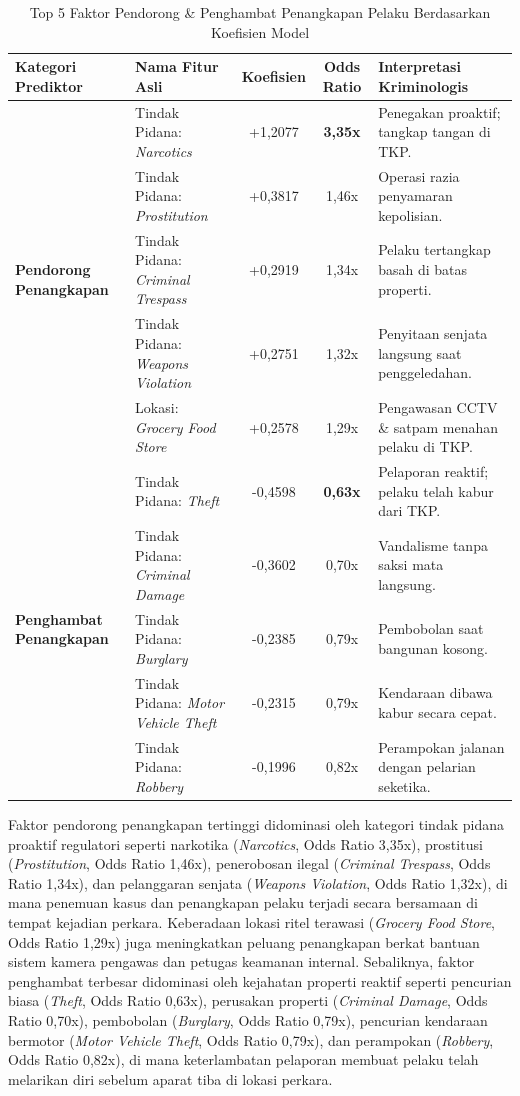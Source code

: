 \documentclass[11pt,a4paper]{article}
\begin{document}
\begin{table}[h]
\centering
\small
\caption{Top 5 Faktor Pendorong \& Penghambat Penangkapan Pelaku Berdasarkan Koefisien Model}
\label{tab:coefficients}
\begin{tabularx}{\textwidth}{lXccX}
\toprule
\textbf{Kategori Prediktor} & \textbf{Nama Fitur Asli} & \textbf{Koefisien} & \textbf{Odds Ratio} & \textbf{Interpretasi Kriminologis} \\
\midrule
\multirow{5}{*}{\textbf{Pendorong Penangkapan}} 
 & Tindak Pidana: \textit{Narcotics} & +1,2077 & \textbf{3,35x} & Penegakan proaktif; tangkap tangan di TKP. \\
 & Tindak Pidana: \textit{Prostitution} & +0,3817 & 1,46x & Operasi razia penyamaran kepolisian. \\
 & Tindak Pidana: \textit{Criminal Trespass} & +0,2919 & 1,34x & Pelaku tertangkap basah di batas properti. \\
 & Tindak Pidana: \textit{Weapons Violation} & +0,2751 & 1,32x & Penyitaan senjata langsung saat penggeledahan. \\
 & Lokasi: \textit{Grocery Food Store} & +0,2578 & 1,29x & Pengawasan CCTV \& satpam menahan pelaku di TKP. \\
\midrule
\multirow{5}{*}{\textbf{Penghambat Penangkapan}} 
 & Tindak Pidana: \textit{Theft} & -0,4598 & \textbf{0,63x} & Pelaporan reaktif; pelaku telah kabur dari TKP. \\
 & Tindak Pidana: \textit{Criminal Damage} & -0,3602 & 0,70x & Vandalisme tanpa saksi mata langsung. \\
 & Tindak Pidana: \textit{Burglary} & -0,2385 & 0,79x & Pembobolan saat bangunan kosong. \\
 & Tindak Pidana: \textit{Motor Vehicle Theft} & -0,2315 & 0,79x & Kendaraan dibawa kabur secara cepat. \\
 & Tindak Pidana: \textit{Robbery} & -0,1996 & 0,82x & Perampokan jalanan dengan pelarian seketika. \\
\bottomrule
\end{tabularx}
\end{table}

Faktor pendorong penangkapan tertinggi didominasi oleh kategori tindak pidana proaktif regulatori seperti narkotika (\textit{Narcotics}, Odds Ratio 3,35x), prostitusi (\textit{Prostitution}, Odds Ratio 1,46x), penerobosan ilegal (\textit{Criminal Trespass}, Odds Ratio 1,34x), dan pelanggaran senjata (\textit{Weapons Violation}, Odds Ratio 1,32x), di mana penemuan kasus dan penangkapan pelaku terjadi secara bersamaan di tempat kejadian perkara. Keberadaan lokasi ritel terawasi (\textit{Grocery Food Store}, Odds Ratio 1,29x) juga meningkatkan peluang penangkapan berkat bantuan sistem kamera pengawas dan petugas keamanan internal. Sebaliknya, faktor penghambat terbesar didominasi oleh kejahatan properti reaktif seperti pencurian biasa (\textit{Theft}, Odds Ratio 0,63x), perusakan properti (\textit{Criminal Damage}, Odds Ratio 0,70x), pembobolan (\textit{Burglary}, Odds Ratio 0,79x), pencurian kendaraan bermotor (\textit{Motor Vehicle Theft}, Odds Ratio 0,79x), dan perampokan (\textit{Robbery}, Odds Ratio 0,82x), di mana keterlambatan pelaporan membuat pelaku telah melarikan diri sebelum aparat tiba di lokasi perkara.
\end{document}
